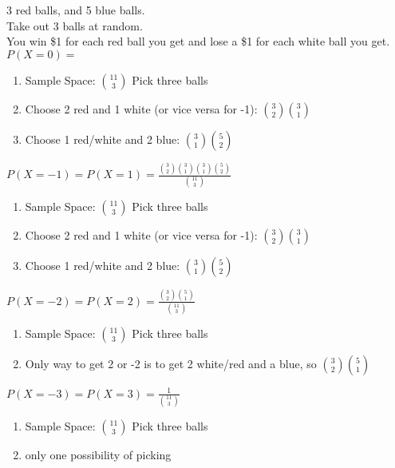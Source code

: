     3 red balls, and 5 blue balls.\\
    Take out 3 balls at random.\\
    You win \$1 for each red ball you get and lose a \$1 for each white ball
    you get.\\
    $P(X = 0) = $\\
    \begin{enumerate}
      \item Sample Space: $\binom{11}{3}$ Pick three balls
      \item Choose 2 red and 1 white (or vice versa for -1): $\binom{3}{2}
        \binom{3}{1}$
      \item Choose 1 red/white and 2 blue: $\binom{3}{1}\binom{5}{2}$
    \end{enumerate}

    $P(X = -1) = P(X = 1) = \frac{\binom{3}{2}\binom{3}{1}\binom{3}{1}{\binom{5}{2}}}{\binom{11}{3}}$\\
    \begin{enumerate}
      \item Sample Space: $\binom{11}{3}$ Pick three balls
      \item Choose 2 red and 1 white (or vice versa for -1): $\binom{3}{2}
        \binom{3}{1}$
      \item Choose 1 red/white and 2 blue: $\binom{3}{1}\binom{5}{2}$
    \end{enumerate}
    $P(X = -2) = P(X = 2) = \frac{\binom{3}{2}\binom{5}{1}}{\binom{11}{3}}$\\
    \begin{enumerate}
      \item Sample Space: $\binom{11}{3}$ Pick three balls
      \item Only way to get 2 or -2 is to get 2 white/red and a blue, so
        $\binom{3}{2}\binom{5}{1}$
    \end{enumerate}
    $P(X = -3) = P(X = 3) = \frac{1}{\binom{11}{3}}$\\
    \begin{enumerate}
      \item Sample Space: $\binom{11}{3}$ Pick three balls
      \item only one possibility of picking
    \end{enumerate}
